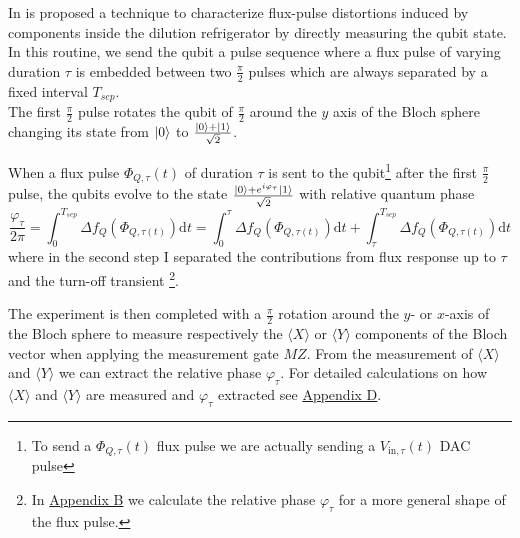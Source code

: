 In \cite{rol_time-domain_2020} is proposed a technique to characterize flux-pulse distortions induced by components inside the dilution refrigerator by directly measuring the qubit state.
In this routine, we send the qubit a pulse sequence where a flux pulse of varying duration $\tau$ is embedded between two $\frac{\pi}{2}$ pulses which are always separated by a fixed interval $T_{sep}$.\\
The first $\frac{\pi}{2}$ pulse rotates the qubit of $\frac{\pi}{2}$ around the $y$ axis of the Bloch sphere changing its state from $\ket{0}$ to $\frac{\ket{0}+\ket{1}}{\sqrt{2}}$.

When a flux pulse $\Phi_{Q,\tau}(t)$ of duration $\tau$ is sent to the qubit\footnote{To send a $\Phi_{Q,\tau}(t)$ flux pulse we are actually sending a $V_{\text{in},\tau}(t)$ DAC pulse} after the first $\frac{\pi}{2}$ pulse, the qubits evolve to the state $\frac{\ket{0}+e^{i\varphi_\tau}\ket{1}}{\sqrt{2}}$ with relative quantum phase 
\begin{equation}\label{eq:phi}
    \frac{\varphi_{\tau}}{2\pi} = \int_{0}^{T_{sep}} \Delta f_Q (\Phi_{Q,\tau(t)})\text{d}t = \int_{0}^{\tau} \Delta f_Q (\Phi_{Q,\tau(t)})\text{d}t + \int_{\tau}^{T_{sep}} \Delta f_Q (\Phi_{Q,\tau(t)})\text{d}t
\end{equation}
where in the second step I separated the contributions from flux response up to $\tau$ and the turn-off transient \footnote{In \hyperref[app:AppendixB]{Appendix B} we calculate the relative phase $\varphi_{\tau}$ for a more general shape of the flux pulse.}. 

The experiment is then completed with a $\frac{\pi}{2}$ rotation around the $y$- or $x$-axis of the Bloch sphere to measure respectively the $\langle X \rangle$ or $\langle Y \rangle$ components of the Bloch vector when applying the measurement gate $MZ$. 
From the measurement of $\langle X \rangle$ and $\langle Y \rangle$ we can extract the relative phase $\varphi_{\tau}$.
For detailed calculations on how $\langle X \rangle$ and $\langle Y \rangle$ are measured and $\varphi_{\tau}$ extracted see \hyperref[app:AppendixD]{Appendix D}. \\ 

